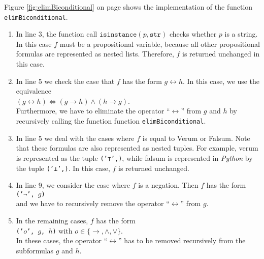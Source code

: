 Figure \ref{fig:elimBiconditional} on page \pageref{fig:elimBiconditional} shows the implementation of the
function \texttt{elimBiconditional}.
\begin{enumerate}
\item In line 3, the function call $\texttt{isinstance}(p, \mathtt{str})$ checks whether $p$ is a string.  In this case
      $f$ must be a propositional variable, because all other propositional formulas are represented as nested lists.
      Therefore, $f$ is returned unchanged in this case.
\item In line 5 we check the case that $f$ has the form $g \leftrightarrow h$.
      In this case, we use the equivalence
      \\[0.2cm]
      \hspace*{1.3cm}
      $(g \leftrightarrow h) \Leftrightarrow (g \rightarrow h) \wedge (h \rightarrow g)$.
      \\[0.2cm]
      Furthermore, we have to eliminate the operator ``$\leftrightarrow$'' from $g$ and $h$ by recursively calling the function
      function \texttt{elimBiconditional}.
\item In line 5 we deal with the cases where $f$ is equal to Verum or Falsum.
      Note that these formulas are also represented as nested tuples.
      For example, verum is represented as the tuple \texttt{('⊤',)}, while falsum is represented in
      \textsl{Python} by the tuple \texttt{('⊥',)}.  In this case, $f$
      is returned unchanged.
\item In line 9, we consider the case where $f$ is a negation.  Then $f$ has the form
      \\[0.2cm]
      \hspace*{1.3cm}
      \texttt{('¬', $g$)}  
      \\[0.2cm]
      and we have to recursively remove the operator ``$\leftrightarrow$'' from $g$.
\item In the remaining cases, $f$ has the form
      \\[0.2cm]
      \hspace*{1.3cm}
      \texttt{('$o$', $g$, $h$)}  \quad with $o \in \{\rightarrow, \wedge, \vee\}$.
      \\[0.2cm]
      In these cases, the operator ``$\leftrightarrow$'' has to be removed recursively from the subformulas $g$ and $h$. 
\end{enumerate}
\FloatBarrier

